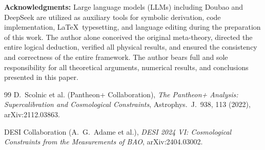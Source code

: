 \documentclass[10pt,a4paper,twocolumn]{article}
\begin{document}
\vspace{1em}
\textbf{Acknowledgments:} Large language models (LLMs) including Doubao and DeepSeek are utilized as auxiliary tools for symbolic derivation, code implementation, \LaTeX\ typesetting, and language editing during the preparation of this work. The author alone conceived the original meta-theory, directed the entire logical deduction, verified all physical results, and ensured the consistency and correctness of the entire framework. The author bears full and sole responsibility for all theoretical arguments, numerical results, and conclusions presented in this paper.


\begin{thebibliography}{99}
D.~Scolnic et al. (Pantheon+ Collaboration),
\emph{The Pantheon+ Analysis: Supercalibration and Cosmological Constraints},
Astrophys.~J.~938, 113 (2022), arXiv:2112.03863.

DESI Collaboration (A.~G.~Adame et al.),
\emph{DESI 2024 VI: Cosmological Constraints from the Measurements of BAO},
arXiv:2404.03002.
\end{thebibliography}
\end{document}
